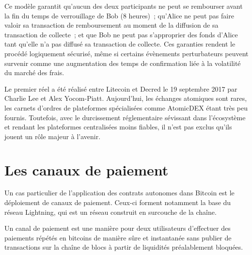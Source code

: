 Ce modèle garantit qu'aucun des deux participants ne peut se rembourser avant la fin du temps de verrouillage de Bob (8 heures)~; qu'Alice ne peut pas faire valoir sa transaction de remboursement au moment de la diffusion de sa transaction de collecte~; et que Bob ne peut pas s'approprier des fonds d'Alice tant qu'elle n'a pas diffusé sa transaction de collecte. Ces garanties rendent le procédé logiquement sécurisé, même si certains évènements perturbateurs peuvent survenir comme une augmentation des temps de confirmation liée à la volatilité du marché des frais.

Le premier  réel a été réalisé entre Litecoin et Decred le 19 septembre 2017 par Charlie Lee et Alex Yocom-Piatt. Aujourd'hui, les échanges atomiques sont rares, les carnets d'ordres de plateformes spécialisées comme AtomicDEX étant très peu fournis. Toutefois, avec le durcissement réglementaire sévissant dans l'écosystème et rendant les plateformes centralisées moins fiables, il n'est pas exclus qu'ils jouent un rôle majeur à l'avenir.

\section*{Les canaux de paiement}

Un cas particulier de l'application des contrats autonomes dans Bitcoin est le déploiement de canaux de paiement. Ceux-ci forment notamment la base du réseau Lightning, qui est un réseau construit en surcouche de la chaîne.

Un canal de paiement est une manière pour deux utilisateurs d'effectuer des paiements répétés en bitcoins de manière sûre et instantanée sans publier de transactions sur la chaîne de blocs à partir de liquidités préalablement bloquées.


